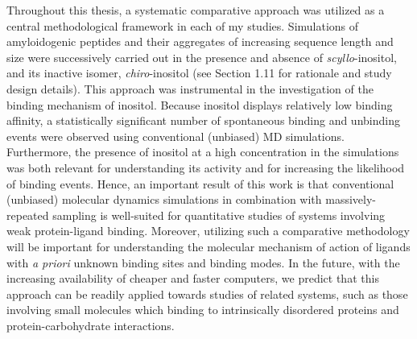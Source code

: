 Throughout this thesis, a systematic comparative approach was utilized as a central methodological framework in each of my studies. Simulations of amyloidogenic peptides and their aggregates of increasing sequence length and size were successively carried out in the presence and absence of \emph{scyllo}-inositol, and its inactive isomer, \emph{chiro}-inositol (see Section 1.11 for rationale and study design details). This approach was instrumental in the investigation of the binding mechanism of inositol.  Because inositol displays relatively low binding affinity, a statistically significant number of spontaneous binding and unbinding events were observed using conventional (unbiased) MD simulations. Furthermore, the presence of inositol at a high concentration in the simulations was both relevant for understanding its activity and for increasing the likelihood of binding events. Hence, an important result of this work is that conventional (unbiased) molecular dynamics simulations in combination with massively-repeated sampling is well-suited for quantitative studies of systems involving weak protein-ligand binding.  Moreover, utilizing such a comparative methodology will be important for understanding the molecular mechanism of action of ligands with \textit{a priori} unknown binding sites and binding modes. In the future, with the increasing availability of cheaper and faster computers, we predict that this approach can be readily applied towards studies of related systems, such as those involving small molecules which binding to intrinsically disordered proteins and protein-carbohydrate interactions.





